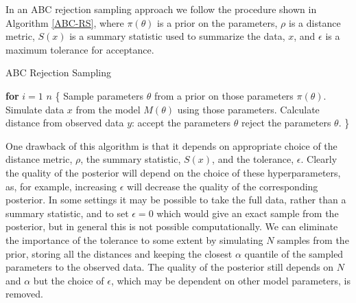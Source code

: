 \documentclass[twocolumn]{biophys}
\begin{document}
In an ABC rejection sampling approach we follow the procedure shown in Algorithm \ref{ABC-RS}, where $\pi(\theta)$ is a prior on the parameters, $\rho$ is a distance metric, $S(x)$ is a summary statistic used to summarize the data, $x$, and $\epsilon$ is a maximum tolerance for acceptance. 
\begin{algorithm}
\caption{ABC Rejection Sampling}\label{ABC-RS}
\begin{algorithmic}[1]
\State \textbf{for} $i=1$  $n$  \{
\State Sample parameters $\theta$ from a prior on those parameters $\pi (\theta)$. 
\State Simulate data $x$ from the model $M(\theta)$ using those parameters. 
\State Calculate distance from observed data $y$: 
 accept the parameters $\theta$
\Else \hspace{2pt} reject the parameters $\theta$.
\EndIf
\State \}
\end{algorithmic}
\end{algorithm}

One drawback of this algorithm is that it depends on appropriate choice of the distance metric, $\rho$, the summary statistic, $S(x)$, and the tolerance, $\epsilon $. 
Clearly the quality of the posterior will depend on the choice of these hyperparameters, as, for example, increasing $\epsilon $ will decrease the quality of the corresponding posterior.
In some settings it may be possible to take the full data, rather than a summary statistic, and to set $\epsilon=0$ which would give an exact sample from the posterior, but in general this is not possible computationally. 
We can eliminate the importance of the tolerance to some extent by simulating $N$ samples from the prior, storing all the distances and keeping the closest $\alpha$ quantile of the sampled parameters to the observed data. 
The quality of the posterior still depends on $N$ and $\alpha$ but the choice of $\epsilon $, which may be dependent on other model parameters, is removed. 
\end{document}

